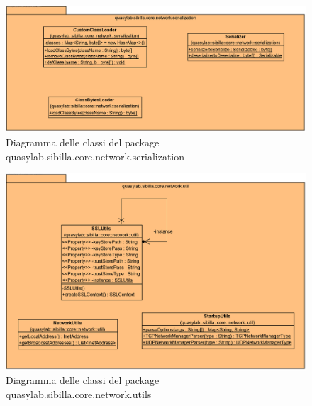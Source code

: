 \begin{figure}[h!]
  \includegraphics[width=\linewidth]{images/quasylab.sibilla.core.network.serialization.png}
  \captionsetup{justification=centering}
  \caption{Diagramma delle classi del package quasylab.sibilla.core.network.serialization}
\end{figure}

\begin{figure}[h!]
  \includegraphics[width=\linewidth]{images/quasylab.sibilla.core.network.utils.png}
  \captionsetup{justification=centering}
  \caption{Diagramma delle classi del package quasylab.sibilla.core.network.utils}
\end{figure}

